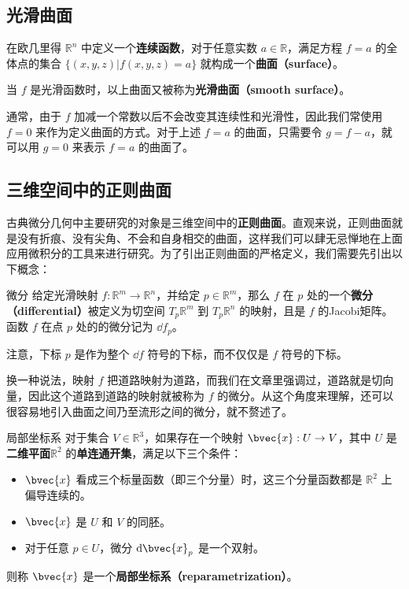 
\subsection{光滑曲面}

在欧几里得 $\mathbb{R}^n$ 中定义一个\textbf{连续函数}，对于任意实数 $a\in\mathbb{R}$，满足方程 $f=a$ 的全体点的集合 $\{(x, y, z)|f(x, y, z)=a\}$ 就构成一个\textbf{曲面（surface）}。

当 $f$ 是光滑函数时，以上曲面又被称为\textbf{光滑曲面（smooth surface）}。

通常，由于 $f$ 加减一个常数以后不会改变其连续性和光滑性，因此我们常使用 $f=0$ 来作为定义曲面的方式。对于上述 $f=a$ 的曲面，只需要令 $g=f-a$，就可以用 $g=0$ 来表示 $f=a$ 的曲面了。

\subsection{三维空间中的正则曲面}

古典微分几何中主要研究的对象是三维空间中的\textbf{正则曲面}。直观来说，正则曲面就是没有折痕、没有尖角、不会和自身相交的曲面，这样我们可以肆无忌惮地在上面应用微积分的工具来进行研究。为了引出正则曲面的严格定义，我们需要先引出以下概念：

\begin{definition}{微分}
给定光滑映射 $f:\mathbb{R}^m\to\mathbb{R}^n$，并给定 $p\in\mathbb{R}^m$，那么 $f$ 在 $p$ 处的一个\textbf{微分（differential）}被定义为切空间 $T_p\mathbb{R}^m$ 到 $T_p\mathbb{R}^n$ 的映射，且是 $f$ 的Jacobi矩阵。函数 $f$ 在点 $p$ 处的的微分记为 $\dd f_p$。
\end{definition}

注意，下标 $p$ 是作为整个 $\dd f$ 符号的下标，而不仅仅是 $f$ 符号的下标。

换一种说法，映射 $f$ 把道路映射为道路，而我们在文章里强调过，道路就是切向量，因此这个道路到道路的映射就被称为 $f$ 的微分。从这个角度来理解，还可以很容易地引入曲面之间乃至流形之间的微分，就不赘述了。


\begin{definition}{局部坐标系}
对于集合 $V\in \mathbb{R}^3$，如果存在一个映射 $\bvec{x}:U\to V$，其中 $U$ 是\textbf{二维平面}$\mathbb{R}^2$ 的\textbf{单连通开集}，满足以下三个条件：
\begin{itemize}
\item $\bvec{x}$ 看成三个标量函数（即三个分量）时，这三个分量函数都是 $\mathbb{R}^2$ 上偏导连续的。
\item $\bvec{x}$ 是 $U$ 和 $V$ 的同胚。
\item 对于任意 $p\in U$，微分 $\mathrm{d}\bvec{x}_p$ 是一个双射。
\end{itemize}
则称 $\bvec{x}$ 是一个\textbf{局部坐标系（reparametrization）}。
\end{definition}

